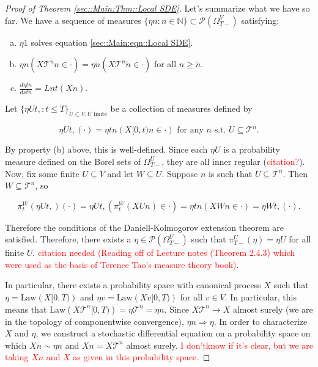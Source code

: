\documentclass[12pt]{article}
\newcommand{\mb}{\mathbb}
\newcommand{\mc}{\mathcal}
\newcommand{\ms}{\mathscr}
\newcommand{\ra}{\rightarrow}
\newcommand{\te}{\text}
\newcommand{\tr}{\textcolor{red}}
\newcommand{\ind}{\hspace{24pt}}
\newcommand{\pmsr}{\mc{P}}							%
\renewcommand{\v}{v}							%
\renewcommand{\U}{U}							%
\newcommand{\UU}{W}								%
\newcommand{\T}{T}								%
\renewcommand{\t}{t}							%
\newcommand{\sset}{\Omega}						%
\newcommand{\proj}{\pi}							%
\renewcommand{\tt}{s}							%
\newcommand{\X}{X}								%
\newcommand{\vsi}[1]{^{#1}}						%
\newcommand{\ts}[1]{_{#1}}						%
\newcommand{\tree}{\mc{T}}						%
\newcommand{\sln}[1]{^{#1}}						%
\newcommand{\alt}[1]{\widetilde{#1}}			%
\newcommand{\mm}{\nu}							%
\newcommand{\mmm}{\eta}							%
\newcommand{\law}{\te{Law}}						%
\newcommand{\dense}{L}							%
\begin{document}
\begin{proof}[Proof of Theorem \ref{sec::Main:Thm::Local SDE}]
\ind Let's summarize what we have so far. We have a sequence of measures \(\{\mmm{}{}{n}:n\in\mb{N}\} \subset \pmsr(\sset\vsi{V}\ts{\T-})\) satisfying:

\begin{enumerate}[(a)]
\item \(\mmm{}{}{1}\) solves equation \eqref{sec::Main:eqn::Local SDE}.

\item \(\mmm{}{}{n}(\X{\tree\sln{\alt{n}}}{}{n} \in \cdot) = \mmm{}{}{\alt{n}}(\X{\tree\sln{\alt{n}}}{}{\alt{n}}\in \cdot)\) for all \(n \geq \alt{n}\).

\item \(\frac{d\mmm{}{\t}{n}}{d\mm{}{\t}{n}} = \dense{n}{\t}(\X{}{}{n})\).
\end{enumerate}

Let \(\{\mmm{\U}{\t,}{}:\t \leq \T\}_{\U\subset V,\U\te{ finite}}\) be a collection of measures defined by

\[\mmm{\U}{\t,}{}(\cdot) = \mmm{}{\t}{n}(\X{}{[0,\t)}{n} \in \cdot) \te{ for any }n\te{ \tt.\t. }\U \subseteq \tree\sln{n}.\]

By property (b) above, this is well-defined. Since each \(\mmm{\U}{}{}\) is a probability measure defined on the Borel sets of \(\sset\vsi{\U}\ts{\T-}\), they are all inner regular (\tr{citation?}). Now, fix some finite \(\U\subseteq V\) and let \(\UU \subseteq \U\). Suppose \(n\) is such that \(\U \subseteq \tree\sln{n}\). Then \(\UU\subseteq \tree\sln{n}\), so

\[\proj\vsi{\UU}\ts{\t}(\mmm{\U}{\t,}{})(\cdot) = \mmm{\U}{\t,}{}\left(\proj\vsi{\UU}\ts{\t}(\X{\U}{}{n}) \in \cdot\right) = \mmm{}{\t}{n}\left(\X{\UU}{}{n} \in \cdot\right) = \mmm{\UU}{\t,}{}(\cdot).\]

Therefore the conditions of the Daniell-Kolmogorov extension theorem are satisfied. Therefore, there exists a \(\mmm{}{}{}\in \ms{P}(\sset\vsi{\U}\ts{\T-})\) such that \(\proj\vsi{\U}\ts{\T-}(\mmm{}{}{}) =\mmm{\U}{}{}\) for all finite \(\U\). \tr{citation needed (Reading off of Lecture notes (Theorem 2.4.3) which were used as the basis of Terence Tao's measure theory book)}.

\ind In particular, there exists a probability space with canonical process \(\X{}{}\) such that \(\mmm{}{}{} = \law(\X{}{[0,\T)})\) and \(\mmm{\v}{}{} = \law(\X{\v}{[0,\T)})\) for all \(\v \in V\). In particular, this means that \(\law(\X{\tree\sln{n}}{[0,\T)}) = \mmm{\tree\sln{n}}{}{} = \mmm{}{}{n}\). Since \(\X{\tree\sln{n}}{} \ra \X{}{}\) almost surely (we are in the topology of componentwise convergence), \(\mmm{}{}{n} \Rightarrow \mmm{}{}{}\). In order to characterize \(\X{}{}\) and \(\mmm{}{}{}\), we construct a stochastic differential equation on a probability space on which \(\X{}{}{n} \sim \mmm{}{}{n}\) and \(\X{}{}{n} = \X{\tree\sln{n}}{}\) almost surely. \tr{I don'\t know if it's clear, but we are taking \(\X{}{}{n}\) and \(\X{}{}\) as given in this probability space.}


\end{proof}
\end{document}
